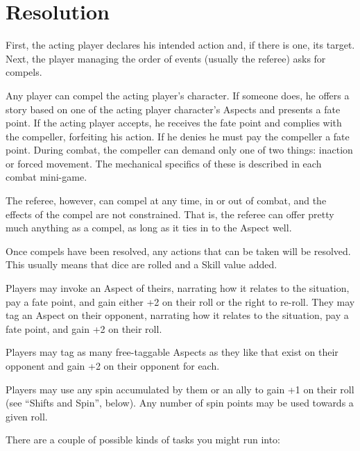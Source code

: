 \newpage
\section{Resolution}
\label{sec:resolution}

First, the acting player declares his intended action and, if there is one, its target. Next, the player managing the order of events (usually the referee) asks for compels.

Any player can compel the acting player's character. If someone does, he offers a story based on one of the acting player character's Aspects and presents a fate point. If the acting player accepts, he receives the fate point and complies with the compeller, forfeiting his action. If he denies he must pay the compeller a fate point. During combat, the compeller can demand only one of two things: inaction or forced movement. The mechanical specifics of these is described in each combat mini-game.

The referee, however, can compel at any time, in or out of combat, and the effects of the compel are not constrained. That is, the referee can offer pretty much anything as a compel, as long as it ties in to the Aspect well.

Once compels have been resolved, any actions that can be taken will be resolved. This usually means that dice are rolled and a Skill value added.

Players may invoke an Aspect of theirs, narrating how it relates to the situation, pay a fate point, and gain either +2 on their roll or the right to re-roll. They may tag an Aspect on their opponent, narrating how it relates to the situation, pay a fate point, and gain +2 on their roll.

Players may tag as many free-taggable Aspects as they like that exist on their opponent and gain +2 on their opponent for each.

Players may use any spin accumulated by them or an ally to gain +1 on their roll (see ``Shifts and Spin'', below). Any number of spin points may be used towards a given roll.


There are a couple of possible kinds of tasks you might run into:

\vfil
